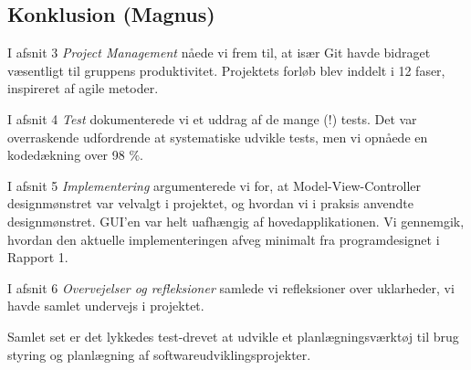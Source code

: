 \subsection{Konklusion (Magnus)} 
I afsnit 3 \textit{Project Management}
nåede vi frem til, at især Git havde bidraget væsentligt til gruppens produktivitet. Projektets forløb blev inddelt i 12 faser, inspireret af agile metoder. 

I afsnit 4 \textit{Test} dokumenterede vi et uddrag af de mange (!) tests. Det var overraskende udfordrende at systematiske udvikle tests, men vi opnåede en kodedækning over 98 $\%$. 

I afsnit 5 \textit{Implementering} argumenterede vi for, at Model-View-Controller designmønstret var velvalgt i projektet, og hvordan vi i praksis anvendte designmønstret. GUI'en var helt uafhængig af hovedapplikationen. Vi gennemgik, hvordan den aktuelle implementeringen afveg minimalt fra programdesignet i Rapport 1.

I afsnit 6 \textit{Overvejelser og refleksioner} samlede vi refleksioner over uklarheder, vi havde samlet undervejs i projektet.

Samlet set er det lykkedes test-drevet at udvikle et planlægningsværktøj til brug styring og planlægning af softwareudviklingsprojekter.